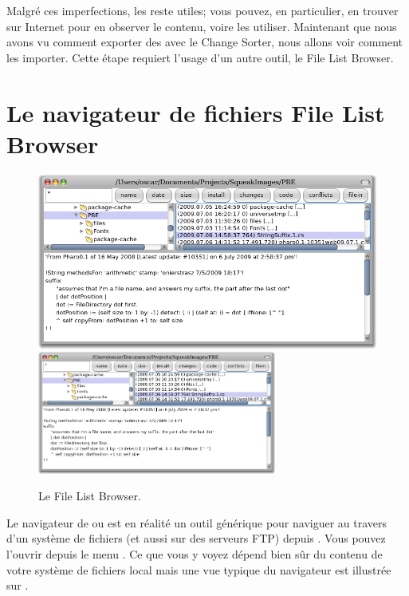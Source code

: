 \documentclass[a4paper,10pt,twoside]{book}
\begin{document}
Malgré ces imperfections, les \changesets reste utiles; vous pouvez, en particulier, en trouver sur Internet pour en observer le contenu, voire les utiliser.
Maintenant que nous avons vu comment exporter des \changesets avec le Change Sorter,
nous allons voir comment les importer.
Cette étape requiert l'usage d'un autre outil, le File List Browser.

\section{Le navigateur de fichiers File List Browser}

\begin{figure}[btp]
	\begin{center}
	\ifluluelse
		{\includegraphics[width=\textwidth]{fileList}}
		{\includegraphics[width=0.7\textwidth]{fileList}}
	\end{center}
	\caption{Le File List Browser.}
\end{figure}

Le navigateur de  ou  est
en réalité un outil générique pour naviguer au travers d'un système de fichiers
(et aussi sur des serveurs FTP) depuis \pharo.
Vous pouvez l'ouvrir depuis le menu . %
Ce que vous y voyez dépend bien sûr du contenu de votre système de fichiers local
mais une vue typique du navigateur est illustrée sur 
.
\end{document}

